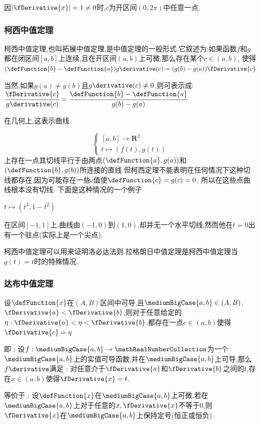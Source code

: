 {{{{因$|\fDerivative{x}| = 1 \neq 0$时,$c$为开区间$(0,2\pi)$中任意一点.
}%

\subsubsection{柯西中值定理}{
  柯西中值定理,也叫拓展中值定理,是中值定理的一般形式.它叙述为:如果函数$f$和$g$都在闭区间$[a,b]$上连续,且在开区间$(a,b)$上可微,那么存在某个$c \in (a,b)$,
  使得$(\defFunction{b} - \defFunction{a})g\derivative(c) = (g(b)-g(a))\fDerivative{c}$

  当然,如果$g(a) \neq g(b)$且$g\derivative(c) \neq 0$,则可表示成:$\cfrac{\fDerivative{c}}{g\derivative(c)} = \cfrac{\defFunction{b} - \defFunction{a}}{g(b) - g(a)}$

  在几何上,这表示曲线

  $$
    \begin{cases}
      [a,b] \to \mathbf{R}^2 \\
      t \mapsto (f(t), g(t))
    \end{cases}
  $$
  上存在一点其切线平行于由两点$(\defFunction{a}, g(a))$和$(\defFunction{b}, g(b))$所连接的直线.但柯西定理不能表明在任何情况下这种切线都存在,因为可能存在一些c值使$\defFunction{c} = g(c) = 0$, 所以在这些点曲线根本没有切线.
  下面是这种情况的一个例子

  $t \mapsto (t^3, 1-t^2)$

  在区间$[-1,1]$上,曲线由$(-1, 0)$到$(1,0)$,却并无一个水平切线,然而他在$t = 0$出有一个驻点(实际上是一个尖点).

  柯西中值定理可以用来证明洛必达法则.拉格朗日中值定理是柯西中值定理当$g(t) = t$时的特殊情况.
}%

\subsubsection{达布中值定理}{
  设$\defFunction{x}$在$(A,B)$区间中可导,且$\mediumBigCase{a,b} \in (A,B)$,$\fDerivative{a} < \fDerivative{b}$,则对于任意给定的$\eta : \fDerivative{a} < \eta < \fDerivative{b}$,都存在一点$c \in (a,b)$使得$\fDerivative{c} = \eta$

  即 : 设$f : \mediumBigCase{a,b} \to \mathRealNumberCollection$为一个$\mediumBigCase{a,b}$上的实值可导函数,并在$\mediumBigCase{a,b}$上可导,那么$f\derivative$满足 : 对任意介于$\fDerivative{a}$和$\fDerivative{b}$之间的$t$,存在$x \in (a,b)$使得$\fDerivative{x} = t$.

  等价于 : 设$\defFunction{x}$在$\mediumBigCase{a,b}$上可微,若在$\mediumBigCase{a,b}$上对于任意的$x,\fDerivative{x}$不等于0,则$\fDerivative{x}$在$\mediumBigCase{a,b}$上保持定号(恒正或恒负).
}%

}}}
